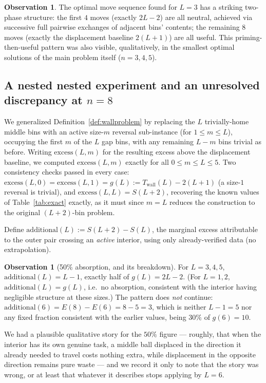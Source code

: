 \documentclass[11pt]{amsart}
\theoremstyle{plain}
\theoremstyle{definition}
\newtheorem{observation}[theorem]{Observation}
\theoremstyle{remark}
\newcommand{\ex}{\mathrm{excess}}
\begin{document}
\begin{observation}
The optimal move sequence found for $L=3$ has a striking two-phase structure: the first $4$ moves (exactly $2L-2$) are all neutral, achieved via successive full pairwise exchanges of adjacent bins' contents; the remaining $8$ moves (exactly the displacement baseline $2(L+1)$) are all useful. This priming-then-useful pattern was also visible, qualitatively, in the smallest optimal solutions of the main problem itself ($n=3,4,5$).
\end{observation}

\subsection{A nested nested experiment and an unresolved discrepancy at $n=8$}

We generalized Definition~\ref{def:wallproblem} by replacing the $L$ trivially-home middle bins with an active size-$m$ reversal sub-instance (for $1\le m\le L$), occupying the first $m$ of the $L$ gap bins, with any remaining $L-m$ bins trivial as before. Writing $\ex(L,m)$ for the resulting excess above the displacement baseline, we computed $\ex(L,m)$ exactly for all $0\le m\le L\le 5$. Two consistency checks passed in every case: $\ex(L,0)=\ex(L,1)=g(L):=T_{\mathrm{wall}}(L)-2(L+1)$ (a size-$1$ reversal is trivial), and $\ex(L,L) = S(L+2)$, recovering the known values of Table~\ref{tab:exact} exactly, as it must since $m=L$ reduces the construction to the original $(L+2)$-bin problem.

Define $\mathrm{additional}(L) := S(L+2)-S(L)$, the marginal excess attributable to the outer pair crossing an \emph{active} interior, using only already-verified data (no extrapolation).

\begin{observation}[50\% absorption, and its breakdown]
\label{obs:absorption}
For $L=3,4,5$, $\mathrm{additional}(L) = L-1$, exactly half of $g(L)=2L-2$. (For $L=1,2$, $\mathrm{additional}(L)=g(L)$, i.e.\ no absorption, consistent with the interior having negligible structure at these sizes.) The pattern does \emph{not} continue: $\mathrm{additional}(6) = E(8)-E(6) = 8-5 = 3$, which is neither $L-1=5$ nor any fixed fraction consistent with the earlier values, being $30\%$ of $g(6)=10$.
\end{observation}

We had a plausible qualitative story for the $50\%$ figure --- roughly, that when the interior has its own genuine task, a middle ball displaced in the direction it already needed to travel costs nothing extra, while displacement in the opposite direction remains pure waste --- and we record it only to note that the story was wrong, or at least that whatever it describes stops applying by $L=6$.
\end{document}
